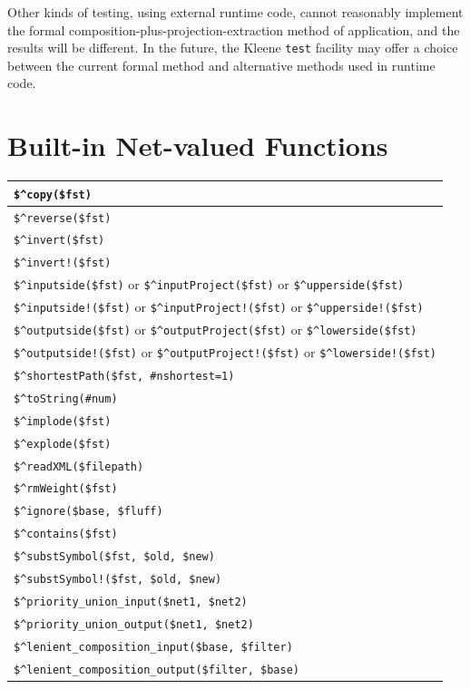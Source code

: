 \documentclass[letterpaper,12pt]{article}
\begin{document}
Other kinds of testing, using external runtime code, cannot reasonably
implement the formal composition-plus-projection-extraction method of
application, and the results will be different.  In the future, the
Kleene \texttt{test} facility may offer a choice between the current
formal method and alternative methods used in runtime code.

\newpage

\section{Built-in Net-valued Functions}

\begin{tabular}{|l|}
\hline
\verb!$^copy($fst)! \\
\hline
\verb!$^reverse($fst)! \\
\verb!$^invert($fst)!  \\
\verb+$^invert!($fst)+  \\
\verb!$^inputside($fst)!  or \verb!$^inputProject($fst)!  or \verb!$^upperside($fst)! \\
\verb+$^inputside!($fst)+  or \verb+$^inputProject!($fst)+  or \verb+$^upperside!($fst)+ \\
\verb!$^outputside($fst)! or \verb!$^outputProject($fst)! or \verb!$^lowerside($fst)! \\
\verb+$^outputside!($fst)+ or \verb+$^outputProject!($fst)+ or \verb+$^lowerside!($fst)+ \\
\verb!$^shortestPath($fst, #nshortest=1)!\\
\hline
\verb!$^toString(#num)! \\
\verb!$^implode($fst)! \\
\verb!$^explode($fst)! \\
\hline
\verb!$^readXML($filepath)! \\
\hline
\verb!$^rmWeight($fst)!\\
\hline
\verb!$^ignore($base, $fluff)! \\
\verb!$^contains($fst)! \\
\hline
\verb!$^substSymbol($fst, $old, $new)!\\
\verb/$^substSymbol!($fst, $old, $new)/\\
\hline
\verb!$^priority_union_input($net1, $net2)! \\
\verb!$^priority_union_output($net1, $net2)! \\
\verb!$^lenient_composition_input($base, $filter)! \\
\verb!$^lenient_composition_output($filter, $base)! \\

\end{tabular}
\end{document}
